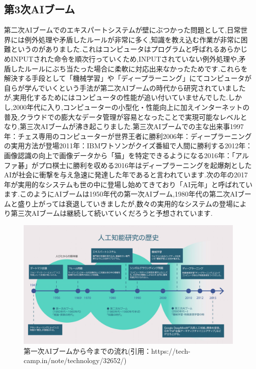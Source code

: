 \subsection{第3次AIブーム}
第二次AIブームでのエキスパートシステムが壁にぶつかった問題として,日常世界には例外処理や矛盾したルールが非常に多く,知識を教え込む作業が非常に困難というのがありました.これはコンピュータはプログラムと呼ばれるあらかじめINPUTされた命令を順次行っていくため,INPUTされていない例外処理や,矛盾したルールにぶち当たった場合に柔軟に対応出来なかったためです.これらを解決する手段として「機械学習」や「ディープラーニング」にてコンピュータが自らが学んでいくという手法が第二次AIブームの時代から研究されていましたが,実用化するためにはコンピュータの性能が追い付いていませんでした.しかし,2000年代に入り,コンピューターの小型化・性能向上に加えインターネットの普及,クラウドでの膨大なデータ管理が容易となったことで実現可能なレベルとなり,第三次AIブームが沸き起こりました.第三次AIブームでの主な出来事1997年：チェス専用のコンピューターが世界王者に勝利2006年：ディープラーニングの実用方法が登場2011年：IBMワトソンがクイズ番組で人間に勝利する2012年：画像認識の向上で画像データから「猫」を特定できるようになる2016年：「アルファ碁」がプロ棋士に勝利を収める2016年はディープラーニングを起爆剤としたAIが社会に衝撃を与え急速に発達した年であると言われています.次の年の2017年が実用的なシステムも世の中に登場し始めてきており「AI元年」と呼ばれています.このようにAIブームは1950年代の第一次AIブーム,1980年代の第二次AIブームと盛り上がっては衰退していきましたが,数々の実用的なシステムの登場により第三次AIブームは継続して続いていくだろうと予想されています.\\
\begin{figure}[!ht]
    \begin{screen}
    \begin{center}
        \includegraphics[scale=1, clip]{./img/AI_History.jpg}
        \caption{第一次AIブームから今までの流れ\newline(引用：https://tech-camp.in/note/technology/32652/)}
        \label{fig:第一次AIブームから今までの流れ}
    \end{center}
\end{screen}
\end{figure}\\
